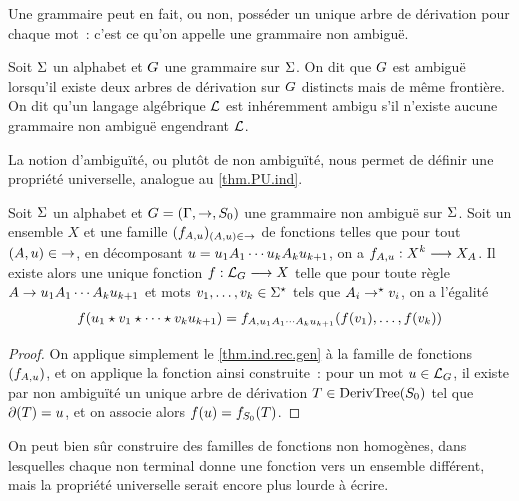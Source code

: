 Une grammaire peut en fait, ou non, posséder un unique arbre de dérivation pour
chaque mot~: c'est ce qu'on appelle une grammaire non ambiguë.

\begin{definition}[Ambiguïté]
  Soit $\Sigma$ un alphabet et $G$ une grammaire sur $\Sigma$. On dit que
  $G$ est ambiguë lorsqu'il existe deux arbres de dérivation sur $G$
  distincts mais de même frontière. On dit qu'un langage algébrique $\mathcal L$ est
  inhéremment ambigu s'il n'existe aucune grammaire non ambiguë engendrant
  $\mathcal L$.
\end{definition}

La notion d'ambiguïté, ou plutôt de non ambiguïté, nous permet de définir une
propriété universelle, analogue au \cref{thm.PU.ind}.

\begin{proposition}
  \label{prop.PU.gram}
  Soit $\Sigma$ un alphabet et $G=(\Gamma,\to,S_{0})$ une grammaire non ambiguë
  sur $\Sigma$. Soit un ensemble $X$ et une famille
  $(f_{A,u})_{(A,u) \in \mathord{\to}}$ de
  fonctions telles que pour tout $(A,u) \in \mathord{\to}$, en
  décomposant $u = u_1A_1\cdots u_kA_ku_{k+1}$, on a
  $f_{A,u} : \displaystyle X^k \longrightarrow X_{A}$.
  Il existe alors une unique fonction $f : \displaystyle \mathcal L_{G} \longrightarrow X$ telle
  que pour toute règle $A \to u_1A_1\cdots A_ku_{k+1}$ et mots
  $v_1,\ldots,v_k\in\Sigma^{\star}$ tels que
  $A_i \to^{\mathord{\star}} v_i$, on a l'égalité
  \[f(u_1\mathbin{\star} v_1\mathbin{\star}\cdots\mathbin{\star} v_k u_{k+1}) =
  f_{A,u_1A_1\cdots A_ku_{k+1}}(f(v_1),\ldots,f(v_k))\]
\end{proposition}

\begin{proof}
  On applique simplement le \cref{thm.ind.rec.gen} à la famille de fonctions
  $(f_{A,u})$, et on applique la fonction ainsi construite~: pour
  un mot $u\in\mathcal L_{G}$, il existe par non ambiguïté un unique arbre
  de dérivation $T\in\operatorname{DerivTree}(S_{0})$ tel que $\mathbin{\partial}(T) = u$, et on
  associe alors $f(u) = f_{S_{0}}(T)$.
\end{proof}

\begin{remark}
  On peut bien sûr construire des familles de fonctions non homogènes, dans
  lesquelles chaque non terminal donne une fonction vers un ensemble différent,
  mais la propriété universelle serait encore plus lourde à écrire.
\end{remark}

